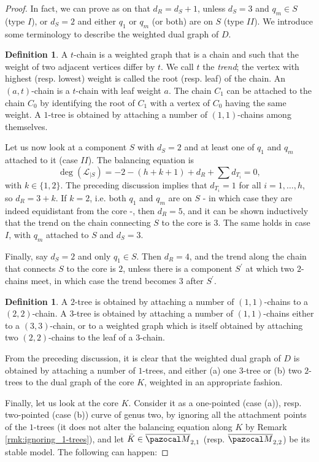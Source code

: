 \documentclass[11pt]{amsart}
\newcommand{\oM}{\overline{\pazocal M}}
\theoremstyle{plain}
\theoremstyle{definition}
\newtheorem{dfn}[thm]{Definition}
\begin{document}
\begin{proof}
In fact, we can prove as on \cite[p.893]{SMY1} that $d_R=d_S+1$, unless $d_S=3$ and $q_m\in S$ (type $I$), or $d_S=2$ and either $q_1$ or $q_m$ (or both) are on $S$ (type $I\!I$). We introduce some terminology to describe the weighted dual graph of $D$.

\begin{dfn}
 A $t$-chain is a weighted graph that is a chain and such that the weight of two adjacent vertices differ by $t$. We call $t$ the \emph{trend}; the vertex with highest (resp. lowest) weight is called the root (resp. leaf) of the chain. An $(a,t)$-chain is a $t$-chain with leaf weight $a$. The chain $C_1$ can be attached to the chain $C_0$ by identifying the root of $C_1$ with a vertex of $C_0$ having the same weight. A $1$-tree is obtained by attaching a number of $(1,1)$-chains among themselves.
\end{dfn}

Let us now look at a component $S$ with $d_S=2$ and at least one of $q_1$ and $q_m$ attached to it (case $I\!I$). The balancing equation is
\[\deg(\mathcal L_{|S})= -2-(h+k+1)+d_R+\sum d_{T_i}=0,\]
with $k\in\{1,2\}$. The preceding discussion implies that $d_{T_i}=1$ for all $i=1,\ldots,h$, so $d_R=3+k$. If $k=2$, i.e. both $q_1$ and $q_m$ are on $S$ - in which case they are indeed equidistant from the core -, then $d_R=5$, and it can be shown inductively that the trend on the chain connecting $S$ to the core is $3$. The same holds in case $I$, with $q_m$ attached to $S$ and $d_S=3$.

Finally, say $d_S=2$ and only $q_1\in S$. Then $d_R=4$, and the trend along the chain that connects $S$ to the core is $2$, unless there is a component $S^\prime$ at which two $2$-chains meet, in which case the trend becomes $3$ after $S^\prime$.

\begin{dfn}
 A $2$-tree is obtained by attaching a number of $(1,1)$-chains to a $(2,2)$-chain. A $3$-tree is obtained by attaching a number of $(1,1)$-chains either to a $(3,3)$-chain, or to a weighted graph which is itself obtained by attaching two $(2,2)$-chains to the leaf of a $3$-chain.
\end{dfn}

From the preceding discussion, it is clear that the weighted dual graph of $D$ is obtained by attaching a number of $1$-trees, and either (a) one $3$-tree or (b) two $2$-trees to the dual graph of the core $K$, weighted in an appropriate fashion.

Finally, let us look at the core $K$. Consider it as a one-pointed (case (a)), resp. two-pointed (case (b)) curve of genus two, by ignoring all the attachment points of the $1$-trees (it does not alter the balancing equation along $K$ by Remark \ref{rmk:ignoring_1-trees}), and let $\bar K\in\oM_{2,1}$ (resp. $\oM_{2,2}$) be its stable model. The following can happen:


\end{proof}
\end{document}
